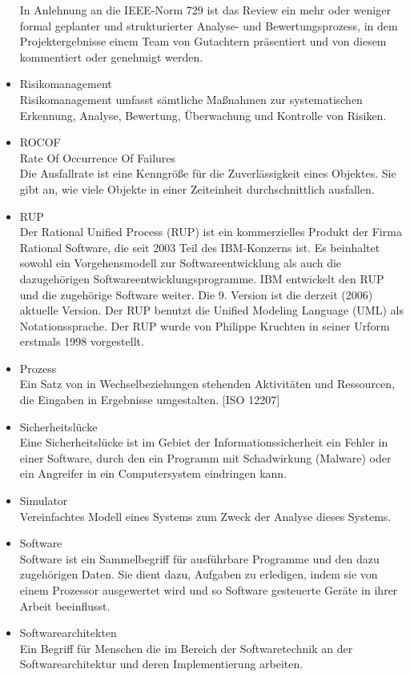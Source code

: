 \begin{itemize}
In Anlehnung an die IEEE-Norm 729 ist das Review ein mehr oder weniger formal geplanter und strukturierter Analyse- und Bewertungsprozess, in dem Projektergebnisse einem Team von Gutachtern präsentiert und von diesem kommentiert oder genehmigt werden.
\item 	Risikomanagement\\
Risikomanagement umfasst sämtliche Maßnahmen zur systematischen Erkennung, Analyse, Bewertung, Überwachung und Kontrolle von Risiken.
\item 	ROCOF \\ Rate Of Occurrence Of Failures \\Die Ausfallrate ist eine Kenngröße für die Zuverlässigkeit eines Objektes. Sie gibt an, wie viele Objekte in einer Zeiteinheit durchschnittlich ausfallen.
\item 	RUP\\Der Rational Unified Process (RUP) ist ein kommerzielles Produkt der Firma Rational Software, die seit 2003 Teil des IBM-Konzerns ist. Es beinhaltet sowohl ein Vorgehensmodell zur Softwareentwicklung als auch die dazugehörigen Softwareentwicklungsprogramme. IBM entwickelt den RUP und die zugehörige Software weiter. Die 9. Version ist die derzeit (2006) aktuelle Version. Der RUP benutzt die Unified Modeling Language (UML) als Notationssprache. Der RUP wurde von Philippe Kruchten in seiner Urform erstmals 1998 vorgestellt.
\item Prozess \\ Ein Satz von in Wechselbeziehungen stehenden Aktivitäten und Ressourcen, die Eingaben in Ergebnisse umgestalten. [ISO 12207]
\item 	Sicherheitslücke\\Eine Sicherheitslücke ist im Gebiet der Informationssicherheit ein Fehler in einer Software, durch den ein Programm mit Schadwirkung (Malware) oder ein Angreifer in ein Computersystem eindringen kann.
\item 	Simulator\\Vereinfachtes Modell eines Systems zum Zweck der Analyse dieses Systems.
\item 	Software\\
Software ist ein Sammelbegriff für ausführbare Programme und den dazu zugehörigen Daten. Sie dient dazu, Aufgaben zu erledigen, indem sie von einem Prozessor ausgewertet wird und so Software gesteuerte Geräte in ihrer Arbeit beeinflusst.
\item 	Softwarearchitekten \\
Ein Begriff für Menschen die im Bereich der Softwaretechnik an der Softwarearchitektur und deren Implementierung arbeiten.

\end{itemize}
